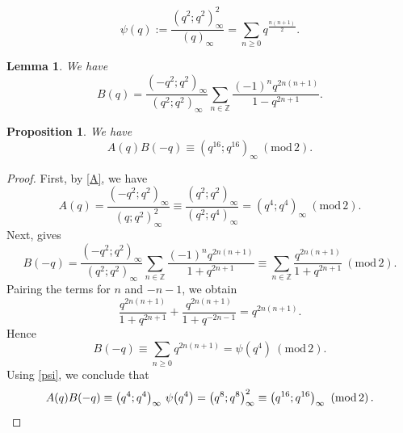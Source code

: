 \documentclass[10pt,a4paper]{amsart}
\newtheorem{lemma}{Lemma}
\newtheorem{proposition}{Proposition}
\renewcommand{\pmod}[1]{\ \left( \mathrm{mod} \, #1 \right)}
\begin{document}
\begin{equation}\label{psi}
\psi(q):=\frac{\left(q^2;q^2\right)^2_{\infty}}{\left(q\right)_{\infty}}=\sum_{n\ge 0}q^{\frac{n(n+1)}{2}}.
\end{equation}

\begin{lemma}\label{And}
	We have %
	\[
	B(q)=\frac{\left(-q^2;q^2\right)_{\infty}}{\left(q^2;q^2\right)_{\infty}}\sum_{n\in \mathbb{Z}}\frac{(-1)^n q^{2n(n+1)}}{1-q^{2n+1}}.
	\]
\end{lemma} 

\begin{proposition}\label{newprop}
	We have
	\[
	A(q)B(-q)\equiv (q^{16};q^{16})_\infty \pmod 2.
	\]
\end{proposition}

\begin{proof}
	First, by \eqref{A}, we have
	\[
	A(q)=\frac{(-q^2;q^2)_\infty}{(q;q^2)_\infty^2}
	\equiv \frac{(q^2;q^2)_\infty}{(q^2;q^4)_\infty}
	=(q^4;q^4)_\infty \pmod 2.
	\]
	Next,  gives
	\[
	B(-q)=\frac{(-q^2;q^2)_\infty}{(q^2;q^2)_\infty}
	\sum_{n\in \mathbb{Z}}\frac{(-1)^n q^{2n(n+1)}}{1+q^{2n+1}}
	\equiv
	\sum_{n\in \mathbb{Z}}\frac{q^{2n(n+1)}}{1+q^{2n+1}} \pmod 2.
	\]
	Pairing the terms for $n$ and $-n-1$, we obtain
	\[
	\frac{q^{2n(n+1)}}{1+q^{2n+1}}
	+
	\frac{q^{2n(n+1)}}{1+q^{-2n-1}}
	= q^{2n(n+1)}.
	\]
	Hence
	\[
	B(-q)\equiv \sum_{n\ge 0} q^{2n(n+1)} = \psi(q^4) \pmod 2.
	\]
	Using \eqref{psi}, we conclude that
	\[
	A(q)B(-q)
	\equiv \left(q^4;q^4\right)_\infty\,\psi\!\left(q^4\right)
	= \left(q^8;q^8\right)_\infty^2
	\equiv \left(q^{16};q^{16}\right)_\infty \pmod 2.\qedhere
	\]
\end{proof}
\end{document}
